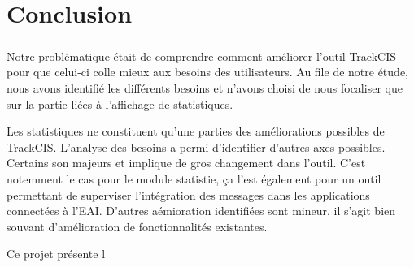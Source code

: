 \chapter*{Conclusion}
	\paragraph{}
	Notre problématique était de comprendre comment améliorer l'outil TrackCIS pour
	que celui-ci colle mieux aux besoins des utilisateurs. Au file de notre étude,
	nous avons identifié les différents besoins et n'avons choisi de nous focaliser
	que sur la partie liées à l'affichage de statistiques.

	Les statistiques ne constituent qu'une parties des améliorations possibles de
	TrackCIS. L'analyse des besoins a permi d'identifier d'autres axes possibles.
	Certains son majeurs et implique de gros changement dans l'outil. C'est
	notemment le cas pour le module statistie, ça l'est également pour un outil
	permettant de superviser l'intégration des messages dans les applications
	connectées à l'EAI. D'autres aémioration identifiées sont mineur, il s'agit
	bien souvant d'amélioration de fonctionnalités existantes.
	
	Ce projet présente l
	
